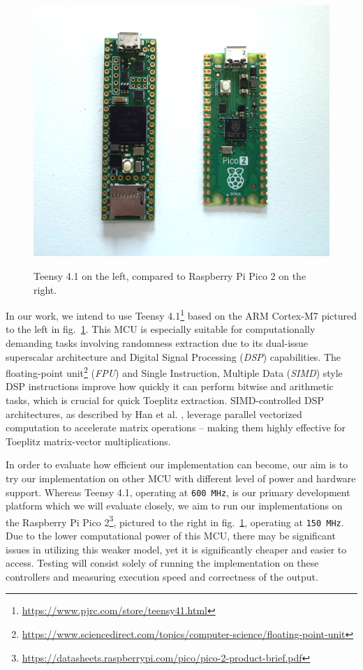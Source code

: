 \begin{figure}
\centering
\includegraphics[width=1\linewidth,height=\textheight,keepaspectratio,alt={Teensy 4.1 on the left, compared to Raspberry Pi Pico 2 on the right.}]{img/mcu.jpeg}
\caption{Teensy 4.1 on the left, compared to Raspberry Pi Pico 2 on the right.}\label{fig:mcu}
\end{figure}

In our work, we intend to use Teensy 4.1\footnote{\url{https://www.pjrc.com/store/teensy41.html}} based on the ARM Cortex-M7 pictured to the left in fig.~\ref{fig:mcu}. This MCU is especially suitable for computationally demanding tasks involving randomness extraction due to its dual-issue superscalar architecture and Digital Signal Processing (\emph{DSP}) capabilities. The floating-point unit\footnote{\url{https://www.sciencedirect.com/topics/computer-science/floating-point-unit}} (\emph{FPU}) and Single Instruction, Multiple Data (\emph{SIMD}) style DSP instructions improve how quickly it can perform bitwise and arithmetic tasks, which is crucial for quick Toeplitz extraction. SIMD-controlled DSP architectures, as described by Han et al. \cite{simd-dsp}, leverage parallel vectorized computation to accelerate matrix operations -- making them highly effective for Toeplitz matrix-vector multiplications.

In order to evaluate how efficient our implementation can become, our aim is to try our implementation on other MCU with different level of power and hardware support. Whereas Teensy 4.1, operating at \texttt{600\ MHz}, is our primary development platform which we will evaluate closely, we aim to run our implementations on the Raspberry Pi Pico 2\footnote{\url{https://datasheets.raspberrypi.com/pico/pico-2-product-brief.pdf}}, pictured to the right in fig.~\ref{fig:mcu}, operating at \texttt{150\ MHz}. Due to the lower computational power of this MCU, there may be significant issues in utilizing this weaker model, yet it is significantly cheaper and easier to access. Testing will consist solely of running the implementation on these controllers and measuring execution speed and correctness of the output.

